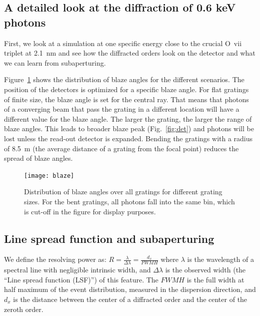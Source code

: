 \documentclass[12pt]{spieman}  %
\begin{document}
\begin{spacing}{1}
\subsection{A detailed look at the diffraction of 0.6 keV photons}
First, we look at a simulation at one specific energy close to the crucial O~{\sc vii} triplet at 2.1~nm and see how the diffracted orders look on the detector and what we can learn from subaperturing.

Figure~\ref{fig:blaze} shows the distribution of blaze angles for the different scenarios. The position of the detectors is optimized for a specific blaze angle. For flat gratings of finite size, the blaze angle is set for the central ray. That means that photons of a converging beam that pass the grating in a different location will have a different value for the blaze angle. The larger the grating, the larger the range of blaze angles. This leads to broader blaze peak (Fig.~\ref{fig:det}) and photons will be lost unless the read-out detector is expanded. Bending the gratings with a radius of 8.5~m (the average distance of a grating from the focal point) reduces the spread of blaze angles.
\label{sect:blaze}

\begin{figure} [ht]
  \begin{center}
  \texttt{[image: blaze]}
  \end{center}
  \caption {\label{fig:blaze}
    Distribution of blaze angles over all gratings for different grating sizes. For the bent gratings, all photons fall into the same bin, which is cut-off in the figure for display purposes.
  }
\end{figure}

\subsection{Line spread function and subaperturing}
\label{sect:LSF}
We define the resolving power as: $R = \frac{\lambda}{\Delta \lambda} =
\frac{d_x}{FWMH}$ where $\lambda$ is the wavelength of a spectral line with negligible intrinsic width, and $\Delta \lambda$ is the observed width (the ``Line spread function (LSF)'') of this feature. The $FWMH$ is the full width at half maximum of the event distribution, measured in the dispersion direction, and $d_x$ is the distance between the center of a diffracted order and the center of the zeroth order.


\end{spacing}
\end{document}
